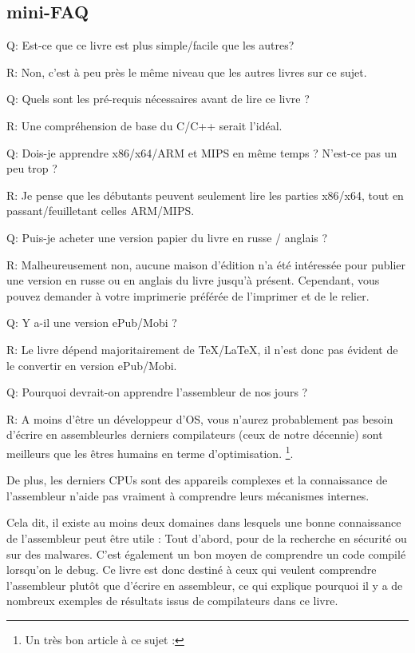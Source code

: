 \subsection*{mini-FAQ}

\par Q: Est-ce que ce livre est plus simple/facile que les autres?
\par R: Non, c'est à peu près le même niveau que les autres livres sur ce sujet.

\par Q: Quels sont les pré-requis nécessaires avant de lire ce livre ?
\par R: Une compréhension de base du C/C++ serait l'idéal.

\par Q: Dois-je apprendre x86/x64/ARM et MIPS en même temps ? N'est-ce pas un peu trop ?
\par R: Je pense que les débutants peuvent seulement lire les parties x86/x64, tout en passant/feuilletant celles ARM/MIPS.

\par Q: Puis-je acheter une version papier du livre en russe / anglais ?
\par R: Malheureusement non, aucune maison d'édition n'a été intéressée pour publier une version en russe ou en anglais du livre jusqu'à présent.
Cependant, vous pouvez demander à votre imprimerie préférée de l'imprimer et de le relier.

\par Q: Y a-il une version ePub/Mobi ?
\par R: Le livre dépend majoritairement de TeX/LaTeX, il n'est donc pas évident de le convertir en version ePub/Mobi.

\par Q: Pourquoi devrait-on apprendre l'assembleur de nos jours ?
\par R: A moins d'être un développeur d'\ac{OS}, vous n'aurez probablement pas besoin d'écrire en assembleur\textemdash{}les derniers compilateurs (ceux de notre décennie) sont meilleurs que les êtres humains en terme d'optimisation. \footnote{Un très bon article à ce sujet : \InSqBrackets{\AgnerFog}}.

De plus, les derniers \ac{CPU}s sont des appareils complexes et la connaissance de l'assembleur n'aide pas vraiment à comprendre leurs mécanismes internes.

Cela dit, il existe au moins deux domaines dans lesquels une bonne connaissance de l'assembleur peut être utile : 
Tout d'abord, pour de la recherche en sécurité ou sur des malwares. C'est également un bon moyen de comprendre un code compilé lorsqu'on le debug.
Ce livre est donc destiné à ceux qui veulent comprendre l'assembleur plutôt que d'écrire en assembleur, ce qui explique pourquoi il y a de nombreux exemples de résultats issus de compilateurs dans ce livre. 

